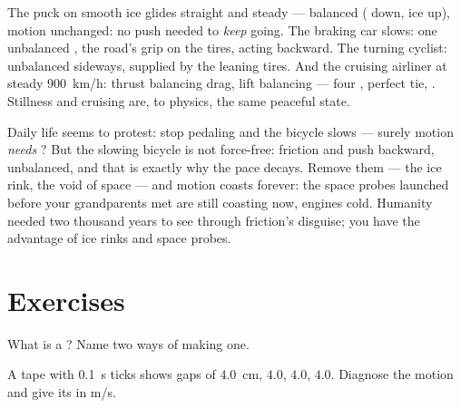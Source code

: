 \begin{example}\label{ex:g9:uniform-varied-motion:reading}
The puck on smooth ice glides straight and steady --- 
balanced ( down, ice up), motion unchanged: no push
needed to \emph{keep} going. The braking car slows: one
unbalanced , the road's grip on the tires, acting
backward. The turning cyclist: unbalanced  sideways,
supplied by the leaning tires. And the cruising airliner at
steady \qty{900}{km/h}: thrust balancing drag, lift
balancing  --- four , perfect tie, . Stillness and cruising are, to physics, the same
peaceful state.
\end{example}

\begin{remark}\label{rem:g9:uniform-varied-motion:surprise}
Daily life seems to protest: stop pedaling and the bicycle
slows --- surely motion \emph{needs} ? But the slowing
bicycle is not force-free: friction and  push backward,
unbalanced, and that is exactly why the pace decays. Remove
them --- the ice rink, the void of space --- and motion
coasts forever: the space probes launched before your
grandparents met are still coasting now, engines cold.
Humanity needed two thousand years to see through friction's
disguise; you have the advantage of ice rinks and space
probes.
\end{remark}

\section{Exercises}

\begin{exercise}[$\star$]\label{exo:g9:uniform-varied-motion:1}
What is a ? Name two ways of making
one.
\end{exercise}

\begin{exercise}[$\star$]\label{exo:g9:uniform-varied-motion:2}
A tape with \qty{0.1}{s} ticks shows gaps of \qty{4.0}{cm},
$4.0$, $4.0$, $4.0$. Diagnose the motion and give its
 in \unit{m/s}.
\end{exercise}


